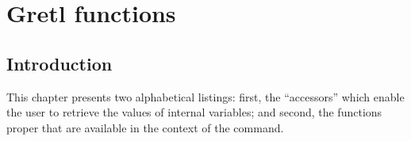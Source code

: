 \chapter{Gretl functions}
\label{chap:funcref}

\section{Introduction}
\label{sec:funcref-intro}

This chapter presents two alphabetical listings: first, the
``accessors'' which enable the user to retrieve the values of internal
variables; and second, the functions proper that are available in the
context of the  command.






